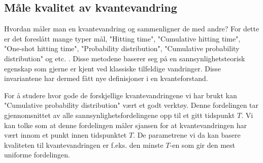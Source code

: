     \subsection{Måle kvalitet av kvantevandring}
    
        Hvordan måler man en kvantevandring og sammenligner de med andre? For dette er det foreslått mange typer mål, "Hitting time", "Cumulative hitting time", "One-shot hitting time", "Probability distribution", "Cumulative probability distribution" og etc. \cite{Venegas_Andraca_2012}\cite{portugal_2019}\cite{Portugal_2015}. Disse metodene baserer seg på en sannsynlighetsteorisk egenskap som gjerne er kjent ved klassiske tilfeldige vandringer. Disse invariantene har dermed fått nye definisjoner i en kvanteforstand.
        
        For å studere hvor gode de forskjellige kvantevandringene vi har brukt kan "Cumulative probability distribution" vært et godt verktøy. Denne fordelingen tar gjennomsnittet av alle sannsynlighetsfordelingene opp til et gitt tidspunkt $T$. Vi kan tolke som at denne fordelingen måler sjansen for at kvantevandringen har vært innom et punkt innen tidspunktet $T$. De parametrene vi da kan basere kvaliteten til kvantevandringen er f.eks. den minste $T$-en som gir den mest uniforme fordelingen. 